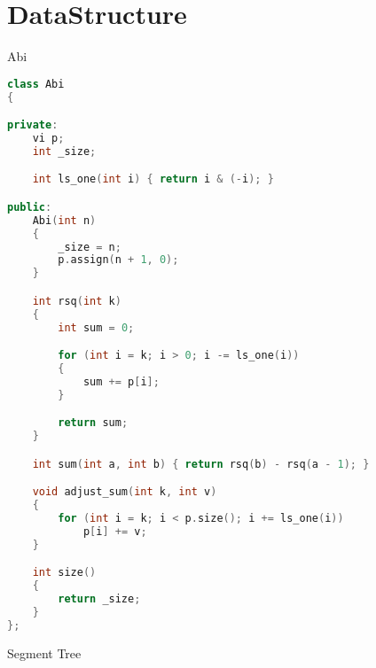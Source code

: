 \documentclass[leter]{amsart}
\begin{document}
\section{DataStructure}
Abi
\begin{multicols}{2}
\begin{lstlisting}[language=C++]
class Abi
{

private:
    vi p;
    int _size;

    int ls_one(int i) { return i & (-i); }

public:
    Abi(int n)
    {
        _size = n;
        p.assign(n + 1, 0);
    }

    int rsq(int k)
    {
        int sum = 0;

        for (int i = k; i > 0; i -= ls_one(i))
        {
            sum += p[i];
        }

        return sum;
    }

    int sum(int a, int b) { return rsq(b) - rsq(a - 1); }

    void adjust_sum(int k, int v)
    {
        for (int i = k; i < p.size(); i += ls_one(i))
            p[i] += v;
    }

    int size()
    {
        return _size;
    }
};

\end{lstlisting}
\end{multicols}
Segment Tree
\end{document}
